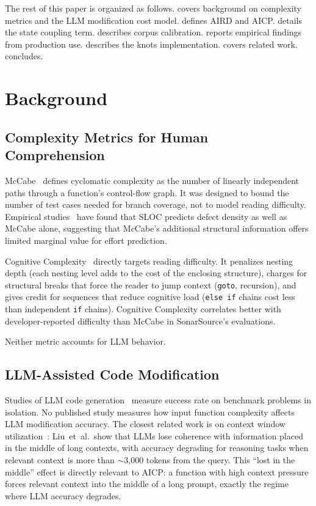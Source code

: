 \documentclass[10pt,twocolumn,letterpaper]{article}
\begin{document}
The rest of this paper is organized as follows.  
covers background on complexity metrics and the LLM modification cost
model.   defines AIRD and AICP.
 details the state coupling term.
 describes corpus calibration.
 reports empirical findings from production use.
 describes the knots implementation.
 covers related work.
 concludes.

\section{Background}
\label{sec:background}

\subsection{Complexity Metrics for Human Comprehension}

McCabe~\cite{mccabe} defines cyclomatic complexity as the number of
linearly independent paths through a function's control-flow graph.  It
was designed to bound the number of test cases needed for branch coverage,
not to model reading difficulty.  Empirical studies~\cite{shepperd} have
found that SLOC predicts defect density as well as McCabe alone, suggesting
that McCabe's additional structural information offers limited marginal
value for effort prediction.

Cognitive Complexity~\cite{cognitive-complexity} directly targets reading
difficulty.  It penalizes nesting depth (each nesting level adds to the
cost of the enclosing structure), charges for structural breaks that
force the reader to jump context (\texttt{goto}, recursion), and gives
credit for sequences that reduce cognitive load (\texttt{else if} chains
cost less than independent \texttt{if} chains).  Cognitive Complexity
correlates better with developer-reported difficulty than McCabe in
SonarSource's evaluations.

Neither metric accounts for LLM behavior.

\subsection{LLM-Assisted Code Modification}

Studies of LLM code generation~\cite{chen-codex,austin-mbpp} measure
success rate on benchmark problems in isolation.  No published study
measures how input function complexity affects LLM modification accuracy.
The closest related work is on context window utilization~\cite{liu-lost}:
Liu~et~al.\ show that LLMs lose coherence with information placed in the
middle of long contexts, with accuracy degrading for reasoning tasks when
relevant context is more than $\sim$3,000 tokens from the query.  This
``lost in the middle'' effect is directly relevant to AICP: a function
with high context pressure forces relevant context into the middle of a
long prompt, exactly the regime where LLM accuracy degrades.
\end{document}
